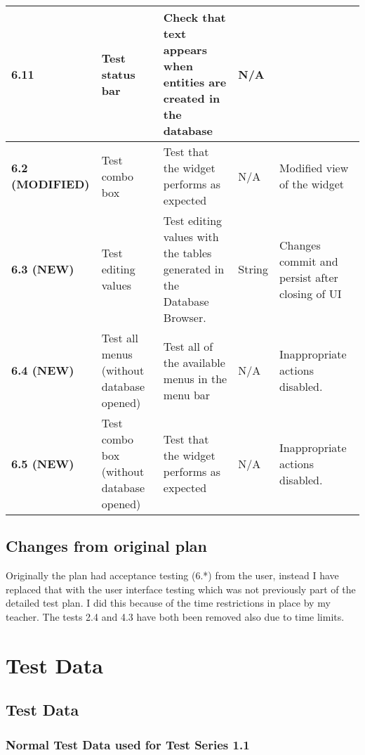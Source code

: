 \documentclass[12pt,a4paper]{report}
\begin{document}
\begin{supertabular}{|m{2.259cm}|m{2.375cm}|m{3.936cm}|m{1.416cm}|m{4.6860003cm}|}
\bfseries 6.11 &
Test status bar &
Check that text appears when entities are created in the database &
N/A &
~
\\\hline
\bfseries 6.2 (MODIFIED) &
Test combo box &
Test that the widget performs as expected &
N/A &
Modified view of the widget\\\hline
\bfseries 6.3 (NEW) &
Test editing values &
Test editing values with the tables generated in the Database Browser. &
String &
Changes commit and persist after closing of UI\\\hline
\bfseries 6.4 (NEW) &
Test all menus (without database opened) &
Test all of the available menus in the menu bar &
N/A &
Inappropriate actions disabled.\\\hline
\bfseries 6.5 (NEW) &
Test combo box (without database opened) &
Test that the widget performs as expected &
N/A &
Inappropriate actions disabled.\\\hline
\end{supertabular}


\bigskip

\subsection{Changes from original plan}
Originally the plan had acceptance testing (6.*) from the user, instead I have replaced that with the user interface testing which was not previously part of the detailed test plan. I did this because of the time restrictions in place by my teacher. The tests 2.4 and 4.3 have both been removed also due to time limits.

\section{Test Data}
\subsection{Test Data}
\subsubsection{Normal Test Data used for Test Series 1.1}
\end{document}
